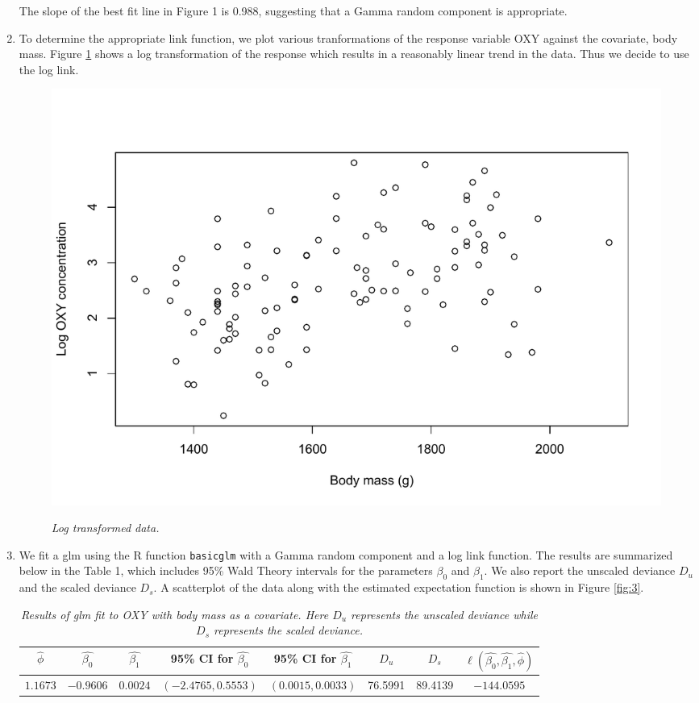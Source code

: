\documentclass[12pt]{article}
\begin{document}
\begin{enumerate}
    The slope of the best fit line in Figure 1 is 0.988, suggesting that a Gamma random component is appropriate.

  \item To determine the appropriate link function, we plot various tranformations of the response variable OXY against the covariate, body mass.
    Figure \ref{fig:2} shows a log transformation of the response which results in a reasonably linear trend in the data. Thus we decide to use the
    log link.
    
    \begin{figure}[h]
      \caption{\emph{Log transformed data.}}
      \centering
      \includegraphics[width=.82\textwidth]{./figures/hw03_log_link.pdf}
      \label{fig:2}
    \end{figure}


  \item We fit a glm using the R function \texttt{basicglm} with a Gamma random component and a log link function. The results are summarized below in
    the Table 1, which includes 95\% Wald Theory intervals for the parameters $\beta_0$ and $\beta_1$. We also report the unscaled deviance $D_{u}$
    and the scaled deviance $D_{s}$.
    A scatterplot of the data along with the estimated expectation function is shown in Figure \ref{fig:3}.

    \begin{table}[h!]
      \caption{\emph{Results of glm fit to OXY with body mass as a covariate. Here $D_{u}$ represents the unscaled deviance while $D_{s}$ represents the
      scaled deviance.}}
      \vspace{.5cm}
      \centering
      \begin{tabular}{c|c|c|c|c|c|c|c}
        \hline
        $\hat{\phi}$ & $\hat{\beta_0}$ & $\hat{\beta_{1}}$ & 95\% CI for $\hat{\beta_0}$ & 95\% CI for $\hat{\beta_1}$ & $D_{u}$ & $D_{s}$ &
        $\ell(\hat{\beta_0}, \hat{\beta_1}, \hat{\phi})$ \\
        \hline
        $1.1673$ & $-0.9606$ & $0.0024$ & $(-2.4765, 0.5553)$ & $(0.0015, 0.0033)$ & 76.5991 & 89.4139 & $-144.0595$ \\
        \hline
      \end{tabular}
      \label{tab:1}
    \end{table}



\end{enumerate}
\end{document}
